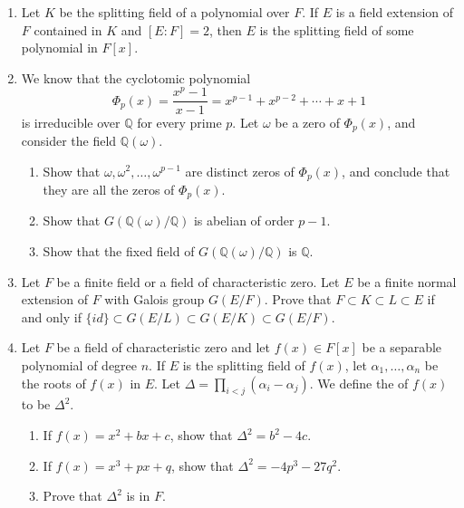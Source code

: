 {\begin{enumerate}
\item
Let $K$ be the splitting field of a polynomial over $F$. If $E$ is a
field extension of $F$ contained in $K$ and $[E:F] = 2$, then $E$ is
the splitting field of some polynomial in $F[x]$.
 
  
 
\item
We know that the cyclotomic polynomial
\[
\Phi_p(x) = \frac{x^p - 1}{x-1} = x^{p-1} + x^{p-2} + \cdots
+ x + 1
\]
is irreducible over ${\mathbb Q}$ for every prime $p$. Let $\omega$ be a
zero of $\Phi_p(x)$, and consider the field ${\mathbb Q}(\omega)$.
\begin{enumerate}
 
 \item
Show that $\omega, \omega^2, \ldots, \omega^{p-1}$ are distinct zeros of
$\Phi_p(x)$, and conclude that they are all the zeros of $\Phi_p(x)$.
 
 \item
Show that $G( {\mathbb Q}( \omega ) / {\mathbb Q} )$ is abelian of order
$p-1$. 
 
 \item
Show that the fixed field of $G( {\mathbb Q}( \omega ) / {\mathbb Q} )$ is
${\mathbb Q}$. 
 
\end{enumerate}
 
  
\item
Let $F$ be a finite field or a field of characteristic zero.
Let $E$ be a finite normal extension of $F$ with Galois group
$G(E/F)$. Prove that $F \subset K \subset L \subset E$ if and 
only if $\{ id \} \subset G(E/L) \subset G(E/K) \subset G(E/F)$.
 
 
\item
Let $F$ be a field of characteristic zero and let $f(x) \in F[x]$ be
a separable polynomial of degree $n$. If $E$ is the splitting field
of $f(x)$, let $\alpha_1, \ldots, \alpha_n$ be the roots of $f(x)$ in
$E$. Let $\Delta = \prod_{i < j} (\alpha_i - \alpha_j)$.  We
define the \label{discriminant} of $f(x)$ to be $\Delta^2$. 
\begin{enumerate}
 
 \item
If $f(x) = x^2 + b x + c$, show that $\Delta^2 = b^2 - 4c$.
 
 \item
If $f(x) = x^3 + p x + q$, show that $\Delta^2 = - 4p^3 - 27q^2$.
 
 \item
Prove that $\Delta^2$ is in $F$.
 

\end{enumerate}
\end{enumerate}}
